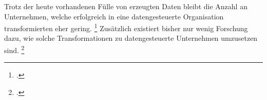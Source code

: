 Trotz der heute vorhandenen Fülle von erzeugten Daten bleibt die Anzahl an Unternehmen, welche erfolgreich in eine datengesteuerte Organisation transformierten eher gering. \footcite[Vgl.][S. 1]{Fabijan.2017}
Zusätzlich existiert bisher nur wenig Forschung dazu, wie solche Transformationen zu datengesteuerte Unternehmen umzusetzen sind. \footcite[Vgl.][S. 1]{Fabijan.2017}

